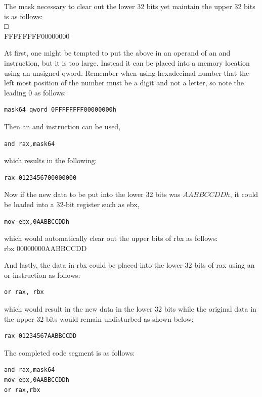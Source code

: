 \documentclass[10pt]{article}
\begin{document}
The mask necessary to clear out the lower 32 bits yet maintain the upper 32 bits is as follows:\\
□\\
FFFFFFFF00000000

At first, one might be tempted to put the above in an operand of an and instruction, but it is too large. Instead it can be placed into a memory location using an unsigned qword. Remember when using hexadecimal number that the left most position of the number must be a digit and not a letter, so note the leading 0 as follows:

\begin{verbatim}
mask64 qword 0FFFFFFFF00000000h
\end{verbatim}

Then an and instruction can be used,

\begin{verbatim}
and rax,mask64
\end{verbatim}

which results in the following:

\begin{verbatim}
rax 0123456700000000
\end{verbatim}

Now if the new data to be put into the lower 32 bits was $A A B B C C D D h$, it could be loaded into a 32-bit register such as ebx,

\begin{verbatim}
mov ebx,0AABBCCDDh
\end{verbatim}

which would automatically clear out the upper bits of rbx as follows:\\
rbx 00000000AABBCCDD

And lastly, the data in rbx could be placed into the lower 32 bits of rax using an or instruction as follows:

\begin{verbatim}
or rax, rbx
\end{verbatim}

which would result in the new data in the lower 32 bits while the original data in the upper 32 bits would remain undisturbed as shown below:

\begin{verbatim}
rax 01234567AABBCCDD
\end{verbatim}

The completed code segment is as follows:

\begin{verbatim}
and rax,mask64
mov ebx,0AABBCCDDh
or rax,rbx
\end{verbatim}
\end{document}
